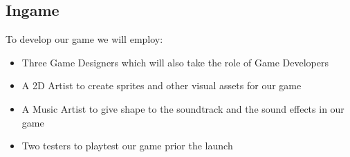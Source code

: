 ﻿\subsection{Ingame}

To develop our game we will employ:

\begin{itemize}
	\item Three Game Designers which will also take the role of Game Developers 
	\item A 2D Artist to create sprites and other visual assets for our game
	\item A Music Artist to give shape to the soundtrack and the sound effects in our game
	\item Two testers to playtest our game prior the launch
\end{itemize}

